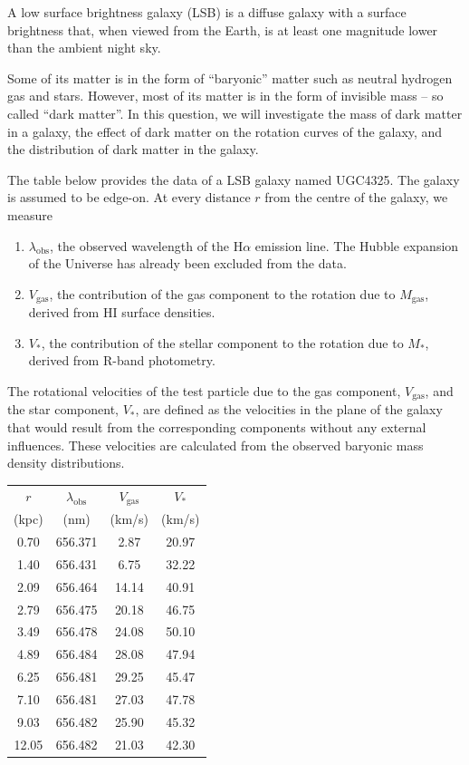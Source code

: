 A low surface brightness galaxy (LSB) is a diffuse galaxy with a surface
brightness that, when viewed from the Earth, is at least one magnitude lower
than the ambient night sky.

Some of its matter is in the form of ``baryonic'' matter such as neutral
hydrogen gas and stars. However, most of its matter is in the form of
invisible mass -- so called ``dark matter''. In this question, we will
investigate the mass of dark matter in a galaxy, the effect of dark matter on
the rotation curves of the galaxy, and the distribution of dark matter in the
galaxy.

The table below provides the data of a LSB galaxy named UGC4325. The galaxy is
assumed to be edge-on. At every distance $r$ from the centre of the galaxy, we
measure
\begin{enumerate}
\item $\lambda_{\mathrm{obs}}$, the observed wavelength of the H$\alpha$
  emission line. The Hubble expansion of the Universe has already been
  excluded from the data.
\item $V_{\mathrm{gas}}$, the contribution of the gas component to the
  rotation due to $M_{\mathrm{gas}}$, derived from HI surface densities.
\item $V_*$, the contribution of the stellar component to the rotation due to
  $M_*$, derived from R-band photometry.
\end{enumerate}
The rotational velocities of the test particle due to the gas component,
$V_{\mathrm{gas}}$, and the star component, $V_*$, are defined as the
velocities in the plane of the galaxy that would result from the corresponding
components without any external influences. These velocities are calculated
from the observed baryonic mass density distributions.

\begin{center}
\begin{tabular}{cccc}
$r$ & $\lambda_{\mathrm{obs}}$ & $V_{\mathrm{gas}}$ & $V_*$ \\
(kpc) & (nm) & (km/s) & (km/s) \\
\hline
 0.70 & 656.371 &  2.87 & 20.97 \\
 1.40 & 656.431 &  6.75 & 32.22 \\
 2.09 & 656.464 & 14.14 & 40.91 \\
 2.79 & 656.475 & 20.18 & 46.75 \\
 3.49 & 656.478 & 24.08 & 50.10 \\
 4.89 & 656.484 & 28.08 & 47.94 \\
 6.25 & 656.481 & 29.25 & 45.47 \\
 7.10 & 656.481 & 27.03 & 47.78 \\
 9.03 & 656.482 & 25.90 & 45.32 \\
12.05 & 656.482 & 21.03 & 42.30 \\
\end{tabular}
\end{center}

